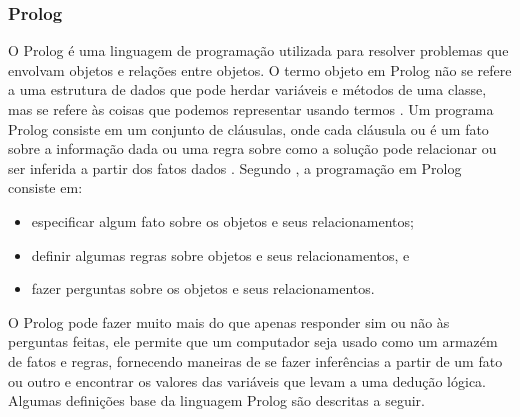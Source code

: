 \subsubsection{Prolog}
O Prolog é uma linguagem de programação utilizada para resolver problemas que envolvam objetos e relações entre objetos. O termo objeto em Prolog não se refere a uma estrutura de dados que pode herdar variáveis e métodos de uma classe, mas se refere às coisas que podemos representar usando termos \cite{clocksin2003programming}.
Um programa Prolog consiste em um conjunto de cláusulas, onde cada cláusula ou é um fato sobre a informação dada ou uma regra sobre como a solução pode relacionar ou ser inferida a partir dos fatos dados \cite{clocksin2003programming}.
Segundo \cite{clocksin2003programming}, a programação em Prolog consiste em: 
\begin{itemize}
\item especificar algum fato sobre os objetos e seus relacionamentos;
\item definir algumas regras sobre objetos e seus relacionamentos, e
\item fazer perguntas sobre os objetos e seus relacionamentos.
\end{itemize}
O Prolog pode fazer muito mais do que apenas responder sim ou não às perguntas feitas, ele permite que um computador seja usado como um armazém de fatos e regras, fornecendo maneiras de se fazer inferências a partir de um fato ou outro e encontrar os valores das variáveis que levam a uma dedução lógica.
Algumas definições base da linguagem Prolog são descritas a seguir.
